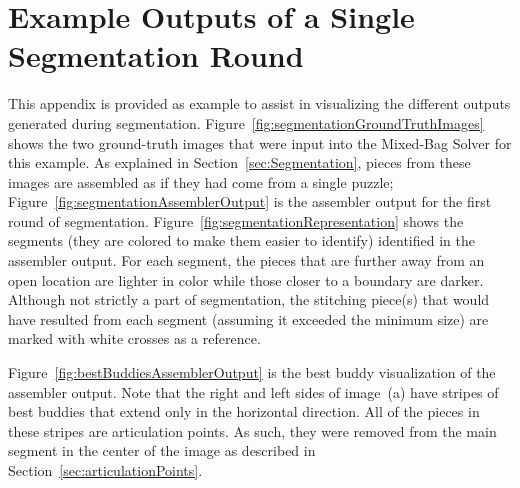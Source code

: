 \chapter{Example Outputs of a Single Segmentation Round\label{app:segmentedOutput}}

This appendix is provided as example to assist in visualizing the different outputs generated during segmentation.  Figure~\ref{fig:segmentationGroundTruthImages} shows the two ground-truth images that were input into the Mixed-Bag Solver for this example.  As explained in Section~\ref{sec:Segmentation}, pieces from these images are assembled as if they had come from a single puzzle;  Figure~\ref{fig:segmentationAssemblerOutput} is the assembler output for the first round of segmentation.  Figure~\ref{fig:segmentationRepresentation} shows the segments (they are colored to make them easier to identify) identified in the assembler output.  For each segment, the pieces that are further away from an open location are lighter in color while those closer to a boundary are darker.  Although not strictly a part of segmentation, the stitching piece(s) that would have resulted from each segment (assuming it exceeded the minimum size) are marked with white crosses as a reference.

Figure~\ref{fig:bestBuddiesAssemblerOutput} is the best buddy visualization of the assembler output.  Note that the right and left sides of image~(a) have stripes of best buddies that extend only in the horizontal direction.  All of the pieces in these stripes are articulation points.  As such, they were removed from the main segment in the center of the image as described in Section~\ref{sec:articulationPoints}.

